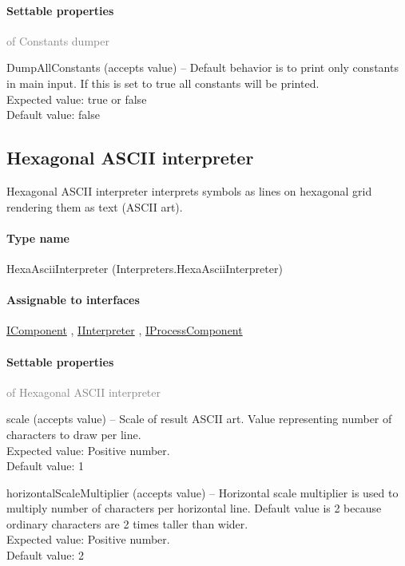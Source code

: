	\paragraph{Settable properties}\textcolor{gray}{of Constants dumper}
	\begin{description*}
		\item[DumpAllConstants]
		(accepts value)
			-- Default behavior is to print only constants in main input.
            If this is set to true all constants will be printed.
			\\ Expected value: true or false
			\\ Default value: false
	\end{description*}
	

\subsection{Hexagonal ASCII interpreter}
\label{Malsys.Processing.Components.Interpreters.HexaAsciiInterpreter}
Hexagonal ASCII interpreter interprets symbols as lines on hexagonal grid rendering them as text (ASCII art).\paragraph{Type name}
HexaAsciiInterpreter (Interpreters.HexaAsciiInterpreter) 	\paragraph{Assignable to interfaces}
		\hyperref[Malsys.Processing.Components.IComponent]{IComponent}%
, 		\hyperref[Malsys.Processing.Components.IInterpreter]{IInterpreter}%
, 		\hyperref[Malsys.Processing.Components.IProcessComponent]{IProcessComponent}%
	\paragraph{Settable properties}\textcolor{gray}{of Hexagonal ASCII interpreter}
	\begin{description*}
		\item[scale]
		(accepts value)
			-- Scale of result ASCII art.
            Value representing number of characters to draw per line.
			\\ Expected value: Positive number.
			\\ Default value: 1
		\item[horizontalScaleMultiplier]
		(accepts value)
			-- Horizontal scale multiplier is used to multiply number of characters per horizontal line.
            Default value is 2 because ordinary characters are 2 times taller than wider.
			\\ Expected value: Positive number.
			\\ Default value: 2
	\end{description*}
